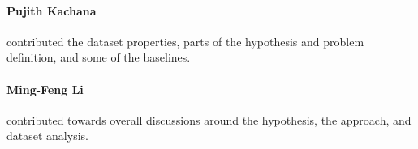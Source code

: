 \documentclass[11pt,a4paper]{article}
\begin{document}
\paragraph{Pujith Kachana} contributed the dataset properties, parts of the hypothesis and problem definition, and some of the baselines.

\paragraph{Ming-Feng Li} contributed towards overall discussions around the hypothesis, the approach, and dataset analysis.





\end{document}
